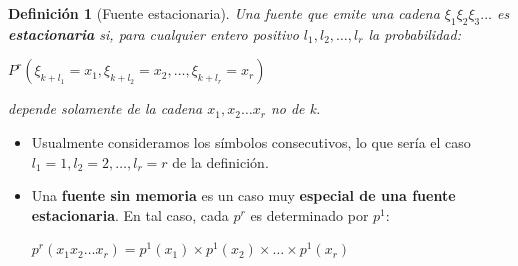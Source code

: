 \documentclass{beamer}
\theoremstyle{plain}
\newtheorem{definicion} [Definicion]{Definición}
\theoremstyle{example}
\theoremstyle{example}
\begin{document}
\begin{frame}  \small

\begin{definicion} [Fuente estacionaria]
Una fuente que emite una cadena $\xi_1 \xi_2 \xi_3 \ldots$ es \textbf{estacionaria} si, para cualquier entero positivo $l_1,l_2, \ldots, l_r$ la probabilidad:

\begin{center}$P^r(\xi_{k+l_1}	= x_1, \xi_{k+l_2}	= x_2, \ldots ,\xi_{k+l_r} = x_r) $\end{center}

depende solamente de la cadena $x_1,x_2 \ldots x_r$ no de k.
\end{definicion}

\footnotesize
\begin{itemize}
\item Usualmente consideramos los símbolos consecutivos, lo que sería el caso $l_1=1, l_2=2,\ldots, l_r=r$ de la definición. 

\item Una \textbf{fuente sin memoria} es un caso muy \textbf{especial de una fuente estacionaria}. En tal caso, cada $p^r$ es determinado por $p^1$:

\begin{center} $p^r(x_1x_2 \ldots x_r) = p^1(x_1) \times p^1(x_2) \times \ldots \times p^1(x_r)$ \end{center}

\end{itemize}

\end{frame}   

\end{document}
